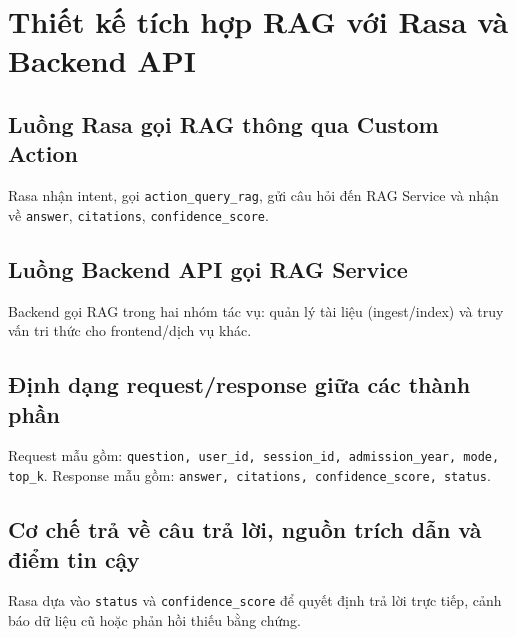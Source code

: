 ﻿\section{Thiết kế tích hợp RAG với Rasa và Backend API}

\subsection{Luồng Rasa gọi RAG thông qua Custom Action}

Rasa nhận intent, gọi \texttt{action\_query\_rag}, gửi câu hỏi đến RAG Service và nhận về \texttt{answer}, \texttt{citations}, \texttt{confidence\_score}.

\subsection{Luồng Backend API gọi RAG Service}

Backend gọi RAG trong hai nhóm tác vụ: quản lý tài liệu (ingest/index) và truy vấn tri thức cho frontend/dịch vụ khác.

\subsection{Định dạng request/response giữa các thành phần}

Request mẫu gồm: \texttt{question, user\_id, session\_id, admission\_year, mode, top\_k}. Response mẫu gồm: \texttt{answer, citations, confidence\_score, status}.

\subsection{Cơ chế trả về câu trả lời, nguồn trích dẫn và điểm tin cậy}

Rasa dựa vào \texttt{status} và \texttt{confidence\_score} để quyết định trả lời trực tiếp, cảnh báo dữ liệu cũ hoặc phản hồi thiếu bằng chứng.
